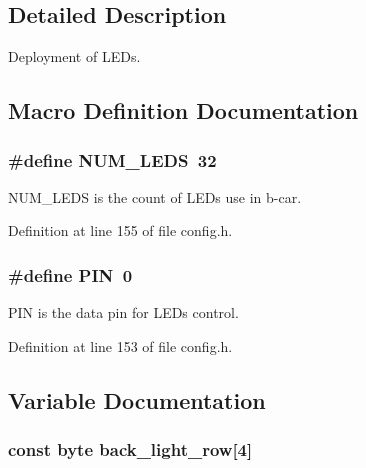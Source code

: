 \subsection{Detailed Description}
Deployment of L\+E\+Ds. 



\subsection{Macro Definition Documentation}
\subsubsection[{\texorpdfstring{N\+U\+M\+\_\+\+L\+E\+DS}{NUM_LEDS}}]{\setlength{\rightskip}{0pt plus 5cm}\#define N\+U\+M\+\_\+\+L\+E\+DS~32}\hypertarget{group__deployment_ga4c4ae9a4146ce8d6a5debc90300d9abd}{}\label{group__deployment_ga4c4ae9a4146ce8d6a5debc90300d9abd}
N\+U\+M\+\_\+\+L\+E\+DS is the count of L\+E\+Ds use in b-\/car. 

Definition at line 155 of file config.\+h.

\subsubsection[{\texorpdfstring{P\+IN}{PIN}}]{\setlength{\rightskip}{0pt plus 5cm}\#define P\+IN~0}\hypertarget{group__deployment_gae1a27401b7fb01ccb9a82dbddbb54eea}{}\label{group__deployment_gae1a27401b7fb01ccb9a82dbddbb54eea}
P\+IN is the data pin for L\+E\+Ds control. 

Definition at line 153 of file config.\+h.



\subsection{Variable Documentation}
\subsubsection[{\texorpdfstring{back\+\_\+light\+\_\+row}{back_light_row}}]{\setlength{\rightskip}{0pt plus 5cm}const byte back\+\_\+light\+\_\+row\mbox{[}4\mbox{]}}\hypertarget{group__deployment_ga3a2101866267bf0af2559a241cdb7cc6}{}\label{group__deployment_ga3a2101866267bf0af2559a241cdb7cc6}


